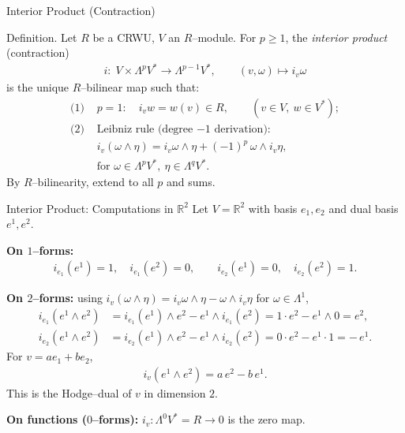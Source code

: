 \begin{frame}{Interior Product (Contraction)}
\begin{block}{Definition.}
Let $R$ be a CRWU, $V$ an $R$–module. For $p\ge 1$, the \emph{interior product} (contraction)
\begin{align*}
i:\; V\times \Lambda^{p}V^{*}\longrightarrow \Lambda^{p-1}V^{*},\qquad (v,\omega)\mapsto i_v\omega
\end{align*}
is the unique $R$–bilinear map such that:
\begin{align*}
\text{(1) } &p=1:\quad i_v w = w(v)\in R,\qquad (v\in V,\ w\in V^*);\\
\text{(2) } &\text{Leibniz rule (degree $-1$ derivation): }\\
& i_v(\omega\wedge\eta)=i_v\omega\wedge \eta+(-1)^{p}\,\omega\wedge i_v\eta,\\
&\text{for }\omega\in\Lambda^{p}V^*,\ \eta\in\Lambda^{q}V^*.
\end{align*}
By $R$–bilinearity, extend to all $p$ and sums.
\end{block}

\end{frame}

\begin{frame}{Interior Product: Computations in $\mathbb{R}^2$}
Let $V=\mathbb{R}^2$ with basis $e_1,e_2$ and dual basis $e^1,e^2$.

\textbf{On $1$–forms:}
\begin{align*}
i_{e_1}(e^1)=1,\quad i_{e_1}(e^2)=0,\qquad
i_{e_2}(e^1)=0,\quad i_{e_2}(e^2)=1.
\end{align*}

\textbf{On $2$–forms:} using $i_v(\omega\wedge\eta)=i_v\omega\wedge\eta- \omega\wedge i_v\eta$ for $\omega\in\Lambda^1$,
\begin{align*}
i_{e_1}(e^1\wedge e^2)&=i_{e_1}(e^1)\wedge e^2 - e^1\wedge i_{e_1}(e^2)= 1\cdot e^2 - e^1\wedge 0 = e^2,\\
i_{e_2}(e^1\wedge e^2)&=i_{e_2}(e^1)\wedge e^2 - e^1\wedge i_{e_2}(e^2)= 0\cdot e^2 - e^1\cdot 1 = -\,e^1.
\end{align*}
For $v=a e_1+b e_2$,
\begin{align*}
i_{v}(e^1\wedge e^2)= a\,e^2 - b\,e^1.
\end{align*}
This is the Hodge–dual of $v$ in dimension $2$.

\textbf{On functions ($0$–forms):} $i_v\colon \Lambda^0 V^*=R\to 0$ is the zero map.
\end{frame}



